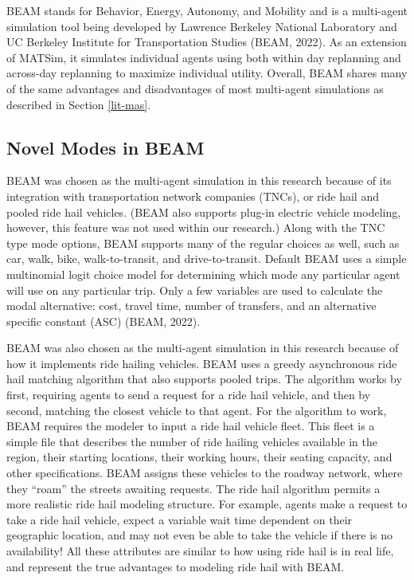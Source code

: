 \documentclass[fancy, masters]{byuthesis}
\begin{document}
BEAM stands for Behavior, Energy, Autonomy, and Mobility and is a multi-agent simulation tool being developed by Lawrence Berkeley National Laboratory and UC Berkeley Institute for Transportation Studies (BEAM, 2022). As an extension of MATSim, it simulates individual agents using both within day replanning and across-day replanning to maximize individual utility. Overall, BEAM shares many of the same advantages and disadvantages of most multi-agent simulations as described in Section \ref{lit-mas}.

\hypertarget{novel-beam}{%
\subsection{Novel Modes in BEAM}\label{novel-beam}}

BEAM was chosen as the multi-agent simulation in this research because of its integration with transportation network companies (TNCs), or ride hail and pooled ride hail vehicles. (BEAM also supports plug-in electric vehicle modeling, however, this feature was not used within our research.) Along with the TNC type mode options, BEAM supports many of the regular choices as well, such as car, walk, bike, walk-to-transit, and drive-to-transit. Default BEAM uses a simple multinomial logit choice model for determining which mode any particular agent will use on any particular trip. Only a few variables are used to calculate the modal alternative: cost, travel time, number of transfers, and an alternative specific constant (ASC) (BEAM, 2022).

BEAM was also chosen as the multi-agent simulation in this research because of how it implements ride hailing vehicles. BEAM uses a greedy asynchronous ride hail matching algorithm that also supports pooled trips. The algorithm works by first, requiring agents to send a request for a ride hail vehicle, and then by second, matching the closest vehicle to that agent. For the algorithm to work, BEAM requires the modeler to input a ride hail vehicle fleet. This fleet is a simple file that describes the number of ride hailing vehicles available in the region, their starting locations, their working hours, their seating capacity, and other specifications. BEAM assigns these vehicles to the roadway network, where they ``roam'' the streets awaiting requests. The ride hail algorithm permits a more realistic ride hail modeling structure. For example, agents make a request to take a ride hail vehicle, expect a variable wait time dependent on their geographic location, and may not even be able to take the vehicle if there is no availability! All these attributes are similar to how using ride hail is in real life, and represent the true advantages to modeling ride hail with BEAM.
\end{document}

